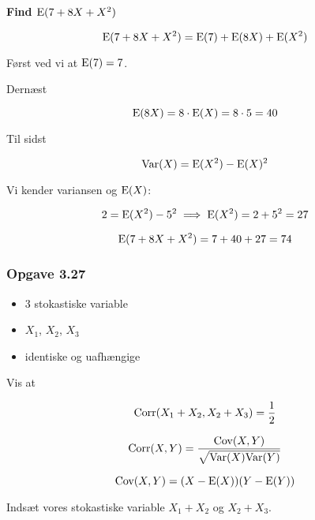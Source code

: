 \textbf{Find $\text{E}(7 + 8X + X^2)$}

\begin{equation}
    \text{E}(7 + 8X + X^2) = \text{E}(7) + \text{E}(8X) + \text{E}(X^2)
\end{equation}

Først ved vi at $\text{E}(7) = 7$.

Dernæst

\begin{equation}
    \text{E}(8X) = 8 \cdot \text{E}(X) = 8\cdot5 = 40
\end{equation}

Til sidst

\begin{equation}
    \text{Var}(X) = \text{E}(X^2) - \text{E}(X)^2 
\end{equation}

Vi kender variansen og $\text{E}(X)$:

\begin{equation}
    2 = \text{E}(X^2) - 5^2 \implies \text{E}(X^2) = 2 + 5^2 = 27
\end{equation}

\begin{equation}
    \text{E}(7 + 8X + X^2) = 7 + 40 + 27 = 74
\end{equation}

\subsubsection{Opgave 3.27}
\begin{itemize}
    \item 3 stokastiske variable
    \item $X_1$, $X_2$, $X_3$
    \item identiske og uafhængige
\end{itemize}

Vis at

\begin{equation}
    \text{Corr}(X_1 + X_2, X_2 + X_3 ) = \frac{1}{2}
\end{equation}

\begin{equation}
    \text{Corr}(X,Y) = \frac{\text{Cov}(X,Y)}{\sqrt{\text{Var}(X)\text{Var}(Y)}}
\end{equation}

\begin{equation}
    \text{Cov}(X,Y) = (X - \text{E}(X))(Y- \text{E}(Y))
\end{equation}

Indsæt vores stokastiske variable $X_1 + X_2$ og $X_2 + X_3$. 

